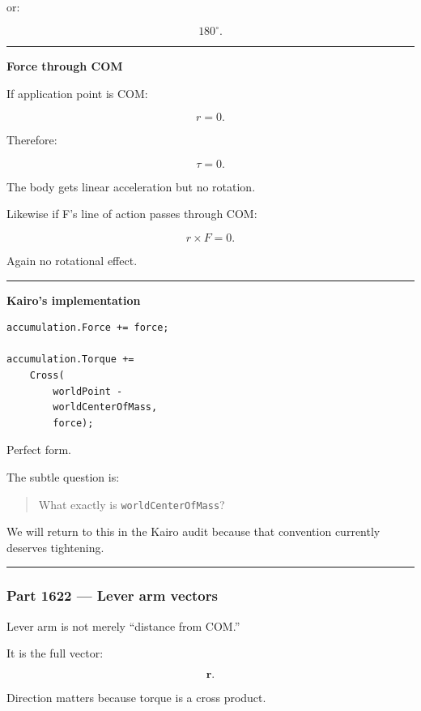 or:

\[
180^\circ.
\]

\begin{center}\rule{0.5\linewidth}{0.5pt}\end{center}

\textbf{Force through COM}

If application point is COM:

\[
r=0.
\]

Therefore:

\[
\tau=0.
\]

The body gets linear acceleration but no rotation.

Likewise if F's line of action passes through COM:

\[
r\times F=0.
\]

Again no rotational effect.

\begin{center}\rule{0.5\linewidth}{0.5pt}\end{center}

\textbf{Kairo's implementation}

\begin{verbatim}
accumulation.Force += force;

accumulation.Torque +=
    Cross(
        worldPoint -
        worldCenterOfMass,
        force);
\end{verbatim}

Perfect form.

The subtle question is:

\begin{quote}
What exactly is \texttt{worldCenterOfMass}?
\end{quote}

We will return to this in the Kairo audit because that convention currently deserves tightening.

\begin{center}\rule{0.5\linewidth}{0.5pt}\end{center}

\subsubsection{Part 1622 --- Lever arm vectors}\label{part-1622-lever-arm-vectors}

Lever arm is not merely ``distance from COM.''

It is the full vector:

\[
\mathbf{r}.
\]

Direction matters because torque is a cross product.

